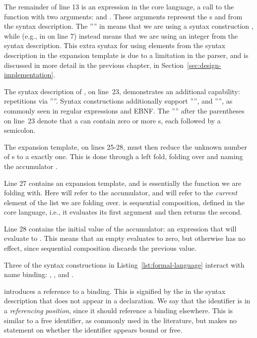 \documentclass{kththesis}
\begin{document}
The remainder of line 13 is an expression in the core language, a call to the function  with two arguments:  and . These arguments represent the s  and  from the syntax description. The '''' in  means that we are using a syntax construction , while  (e.g., in  on line 7) instead means that we are using an integer from the syntax description. This extra syntax for using elements from the syntax description in the expansion template is due to a limitation in the parser, and is discussed in more detail in the previous chapter, in Section~\ref{sec:design-implementation}.

The syntax description of , on line~23, demonstrates an additional capability: repetitions via ''\syncon{*}''. Syntax constructions additionally support ''\syncon{+}'', and '''', as commonly seen in regular expressions and EBNF. The ''\syncon{*}'' after the parentheses on line~23 denote that a  can contain zero or more s, each followed by a semicolon.

The expansion template, on lines 25-28, must then reduce the unknown number of s to a exactly one. This is done through a left fold, folding over  and naming the accumulator .

Line 27 contains an expansion template, and is essentially the function we are folding with. Here  will refer to the accumulator, and  will refer to the \emph{current} element of the list we are folding over.  is sequential composition, defined in the core language, i.e., it evaluates its first argument and then returns the second.

Line 28 contains the initial value of the accumulator: an expression that will evaluate to . This means that an empty  evaluates to zero, but otherwise has no effect, since sequential composition discards the previous value.

Three of the syntax constructions in Listing~\ref{lst:formal-language} interact with name binding: , , and .

 introduces a reference to a binding. This is signified by the  in the syntax description that does not appear in a  declaration. We say that the identifier is in a \emph{referencing position}, since it should reference a binding elsewhere. This is similar to a free identifier, as commonly used in the literature, but makes no statement on whether the identifier appears bound or free.
\end{document}

